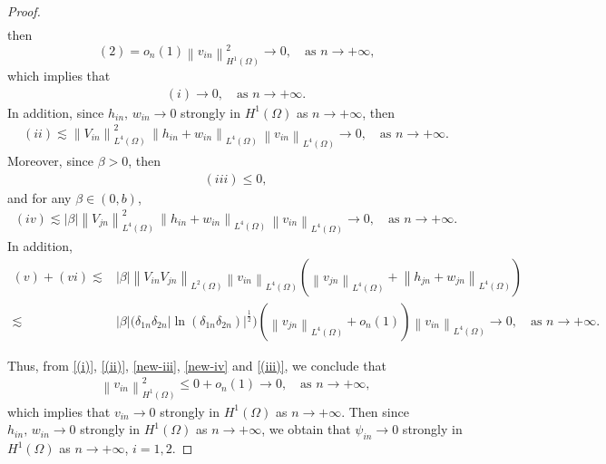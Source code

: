\documentclass[10pt,a4paper]{amsart}
\begin{document}
\begin{proof}
\begin{align}
\end{align}
then  $$(2)= o_{n}(1)\left\|v_{in}\right\|_{H^1(\Omega)}^2\to 0,\quad\text{as $n \rightarrow+\infty$,}$$  which implies that \begin{align}
    \label{(i)}
    (i)\to 0,\quad\text{as $n \rightarrow+\infty$.}
\end{align}
In addition, since $h_{in},\,w_{in}\to 0$  strongly in \(H^{1}(\Omega)\) as $n \rightarrow+\infty$, then
\begin{align}
    \label{(ii)}
    (ii)\lesssim\left\|V_{in}\right\|^2_{L^4(\Omega)}\,\left\|h_{in}+w_{in}\right\|_{L^4(\Omega)}\,\left\|v_{in}\right\|_{L^4(\Omega)}\to 0,\quad\text{as $n \rightarrow+\infty$.}
\end{align}
Moreover, since $\beta>0$, then 
\begin{align}
    \label{new-iii}
    (iii)\leq 0,
\end{align}
and for any $\beta\in (0,b)$, 
\begin{align}\label{new-iv}
    (iv)\lesssim|\beta|\left\|V_{jn}\right\|^2_{L^4(\Omega)}\,\left\|h_{in}+w_{in}\right\|_{L^4(\Omega)}\,\left\|v_{in}\right\|_{L^4(\Omega)}\to 0,\quad\text{as $n \rightarrow+\infty$.}
\end{align}
In addition, 
\begin{align}
    \label{(iii)}
    (v)+(vi)\lesssim&|\beta|\left\|V_{in}V_{jn}\right\|_{L^2(\Omega)}\left\|v_{in}\right\|_{L^4(\Omega)}\left(\left\|v_{jn}\right\|_{L^4(\Omega)}+\left\|h_{jn}+w_{jn}\right\|_{L^4(\Omega)}\right)\nonumber\\\lesssim&|\beta|\Big(\delta_{1n}\delta_{2n}|\ln{\left(\delta_{1n}\delta_{2n}\right)}|^{\frac{1}{2}}\Big)\left(\left\|v_{jn}\right\|_{L^4(\Omega)}+o_n(1)\right)\left\|v_{in}\right\|_{L^4(\Omega)}\to 0,\quad\text{as $n \rightarrow+\infty$.}
\end{align}



Thus, from \eqref{(i)}, \eqref{(ii)}, \eqref{new-iii}, \eqref{new-iv} and  \eqref{(iii)}, we conclude that 
\begin{align*}
    \left\|v_{in}\right\|_{H^1(\Omega)}^2\leq 0+o_{n}(1)\to 0,\quad\text{as $n \rightarrow+\infty$},
\end{align*}
which implies that \( {v}_{in}\to 0 \) strongly in \(H^{1}(\Omega)\) as $n \rightarrow+\infty$. Then since $h_{in},\,w_{in}\to 0$  strongly in \(H^{1}(\Omega)\) as $n \rightarrow+\infty$, we obtain that
\( {\psi}_{in}\to 0 \) strongly in \(H^{1}(\Omega)\) as $n \rightarrow+\infty$, $i=1,2$. 


\end{proof}
\end{document}
